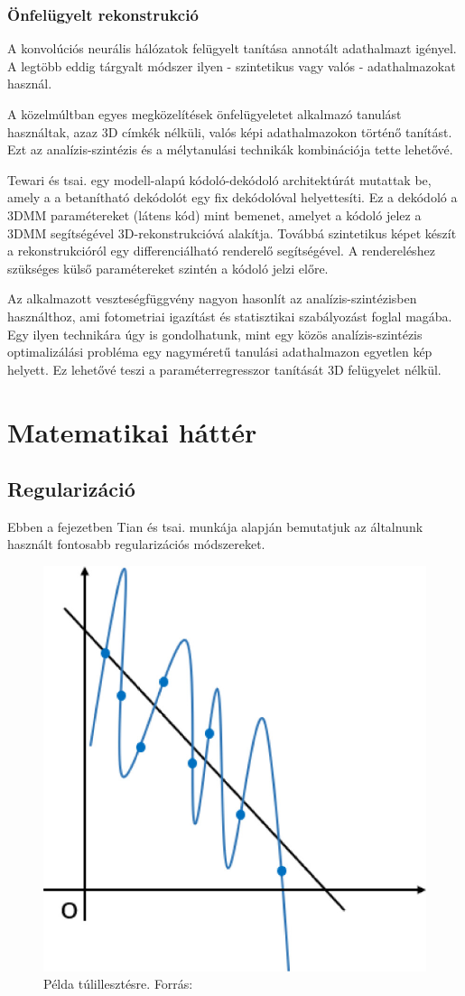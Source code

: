 \documentclass[12pt,a4]{article}
\begin{document}
	\subsubsection{Önfelügyelt rekonstrukció}
	A konvolúciós neurális hálózatok felügyelt tanítása annotált adathalmazt igényel. A legtöbb
	eddig tárgyalt módszer ilyen - szintetikus vagy valós - adathalmazokat használ.
	
	\cite{3dmm}A közelmúltban egyes megközelítések önfelügyeletet alkalmazó
	tanulást használtak, azaz 3D címkék nélküli, valós képi adathalmazokon történő tanítást.
	Ezt az analízis-szintézis és a mélytanulási technikák kombinációja tette lehetővé.
	
	\cite{tewari}Tewari és tsai. egy modell-alapú kódoló-dekódoló architektúrát mutattak be, amely a
	a betanítható dekódolót egy fix dekódolóval helyettesíti. Ez a dekódoló a 3DMM paramétereket (látens kód)
	mint bemenet, amelyet a kódoló jelez a 3DMM segítségével 3D-rekonstrukcióvá alakítja.
	Továbbá szintetikus képet készít a rekonstrukcióról egy differenciálható renderelő segítségével.
	A rendereléshez szükséges külső paramétereket szintén a kódoló jelzi előre. 
	
	\cite{3dmm}Az alkalmazott veszteségfüggvény nagyon hasonlít az analízis-szintézisben használthoz, ami fotometriai igazítást és statisztikai szabályozást foglal magába. Egy ilyen technikára úgy is gondolhatunk, mint egy közös analízis-szintézis optimalizálási probléma egy nagyméretű tanulási
	adathalmazon egyetlen kép helyett. Ez lehetővé teszi a paraméterregresszor tanítását 3D felügyelet nélkül.

    \section{Matematikai háttér}
        \subsection{Regularizáció}

        Ebben a fejezetben \cite{regularization-survey}Tian és tsai. munkája alapján bemutatjuk az általnunk használt fontosabb regularizációs módszereket.

        \begin{figure}[h]	
     		 \centering
     		 \includegraphics[width=0.5\linewidth]{overfitting.jpg}
     		 \caption{Példa túlillesztésre.
     			    Forrás:\cite{regularization-survey}}
                \label{fig:overfitting}
     	\end{figure}
        
\end{document}
